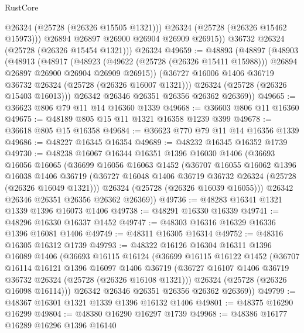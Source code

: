 \begin{lexlean}{RustCore}
\begin{coremodule}
              @26324
              (@25728 (@26326 @15505 @1321)))
            @26324
            (@25728 (@26326 @15462 @15973)))
          @26894
          @26897
          @26900
          @26904
          @26909
          @26915))
      @36732
      @26324
      (@25728 (@26326 @15454 @1321)))
    @26324
@49659 := @48893
    (@48897
      (@48903
        (@48913
          (@48917
            (@48923
              (@49622 (@25728 (@26326 @15411 @15988)))
              @26894
              @26897
              @26900
              @26904
              @26909
              @26915))
          (@36727 @16006 @1406 @36719 @36732 @26324 (@25728 (@26326 @16007 @1321)))
          @26324
          (@25728 (@26326 @15403 @16013)))
        @26342
        @26346
        @26351
        @26356
        @26362
        @26369))
@49665 := @36623 @806 @79 @11 @14 @16360 @1339
@49668 := @36603 @806 @11 @16360
@49675 := @48189 @805 @15 @11 @1321 @16358 @1239 @399
@49678 := @36618 @805 @15 @16358
@49684 := @36623 @770 @79 @11 @14 @16356 @1339
@49686 := @48227 @16345 @16354
@49689 := @48232 @16345 @16352 @1739
@49730 := @48238
    @16067
    @16344
    @16351
    @1396
    @16030
    @1406
    (@36693
      @16056
      @16065
      (@36699
        @16056
        @16063
        @1452
        (@36707
          @16055
          @16062
          @1396
          @16038
          @1406
          @36719
          (@36727 @16048 @1406 @36719 @36732 @26324 (@25728 (@26326 @16049 @1321)))
          @26324
          (@25728 (@26326 @16039 @16055)))
        @26342
        @26346
        @26351
        @26356
        @26362
        @26369))
@49736 := @48283 @16341 @1321 @1339 @1396 @16073 @1406
@49738 := @48291 @16330 @16339
@49741 := @48296 @16330 @16337 @1452
@49747 := @48303 @16316 @16329 @16336 @1396 @16081 @1406
@49749 := @48311 @16305 @16314
@49752 := @48316 @16305 @16312 @1739
@49793 := @48322
    @16126
    @16304
    @16311
    @1396
    @16089
    @1406
    (@36693
      @16115
      @16124
      (@36699
        @16115
        @16122
        @1452
        (@36707
          @16114
          @16121
          @1396
          @16097
          @1406
          @36719
          (@36727 @16107 @1406 @36719 @36732 @26324 (@25728 (@26326 @16108 @1321)))
          @26324
          (@25728 (@26326 @16098 @16114)))
        @26342
        @26346
        @26351
        @26356
        @26362
        @26369))
@49799 := @48367 @16301 @1321 @1339 @1396 @16132 @1406
@49801 := @48375 @16290 @16299
@49804 := @48380 @16290 @16297 @1739
@49968 := @48386
    @16177
    @16289
    @16296
    @1396
    @16140

\end{coremodule}
\end{lexlean}
